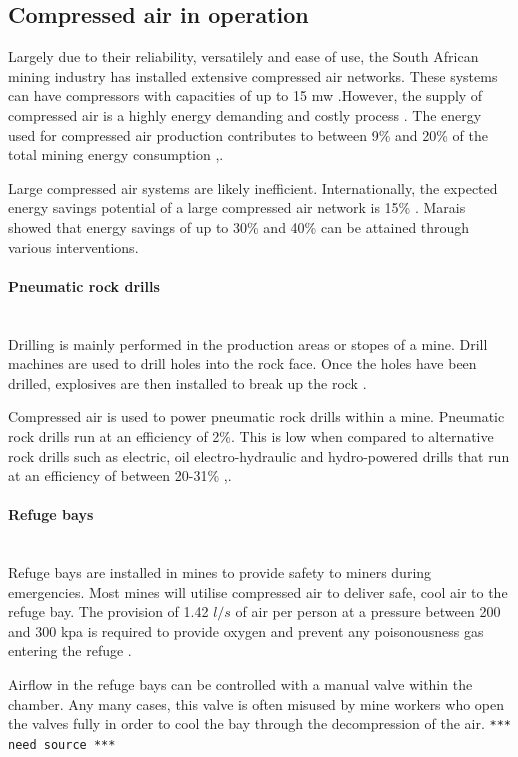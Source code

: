 	\subsection{Compressed air in operation}
		Largely due to their reliability, versatilely and ease of use, the South African mining industry has installed extensive compressed air networks. These systems can have compressors with capacities of up to 15 \gls{mw} \cite{Marais2012PhD}.However, the supply of compressed air is a highly energy demanding and costly process \cite{padachi2009energy}.  The energy used for compressed air production contributes to between 9\% and 20\% of the total mining energy consumption	\cite{Eskom2010Energy},\cite{du2011development}. 
		\par
		Large compressed air systems are likely inefficient. Internationally, the expected energy savings potential of a large compressed air network is 15\% \cite{neale2009compressed}. Marais \cite{marais2013simplification} showed that energy savings of up to 30\% and 40\% can be attained through various interventions. 
		\paragraph{Pneumatic rock drills}\leavevmode\\
	 		Drilling is mainly performed in the production areas or stopes of a mine. Drill machines are used to drill holes into the rock face. Once the holes have been drilled, explosives are then installed to break up the rock \cite{van2008development}.
	 		\par
	  		Compressed air is used to power pneumatic rock drills within a mine. Pneumatic rock drills run at an efficiency of 2\%. This is low when compared to alternative rock drills such as electric, oil electro-hydraulic and hydro-powered drills that run at an efficiency of between 20-31\% \cite{fraser2008saving},\cite{vanTonder2010Masters}. 
			\paragraph{Refuge bays}\leavevmode\\
				Refuge bays are installed in mines to provide safety to miners during emergencies. Most mines will utilise compressed air to deliver safe, cool air to the refuge bay. The provision of 1.42 $l/s$ of air per person at a pressure between 200 and 300 \gls{kpa} is required to provide oxygen and prevent any poisonousness gas entering the refuge \cite{brake1999criteria}.\par
				Airflow in the refuge bays can be controlled with a manual valve within the chamber. Any many cases, this valve is often misused by mine workers who open the valves fully in order to cool the bay through the decompression of the air. \texttt{*** need source ***}

